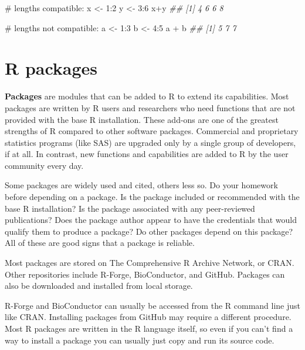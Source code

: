 \documentclass[
  13,
  letterpaper,
]{report}
\newenvironment{Shaded}{\begin{snugshade}}{\end{snugshade}}
\newcommand{\CommentTok}[1]{\textcolor[rgb]{0.37,0.37,0.37}{#1}}
\newcommand{\DecValTok}[1]{\textcolor[rgb]{0.68,0.00,0.00}{#1}}
\newcommand{\DocumentationTok}[1]{\textcolor[rgb]{0.37,0.37,0.37}{\textit{#1}}}
\newcommand{\NormalTok}[1]{\textcolor[rgb]{0.00,0.23,0.31}{#1}}
\newcommand{\OtherTok}[1]{\textcolor[rgb]{0.00,0.23,0.31}{#1}}
\newcommand{\SpecialCharTok}[1]{\textcolor[rgb]{0.37,0.37,0.37}{#1}}
\begin{document}
\begin{Shaded}
\begin{Highlighting}[]
\CommentTok{\# lengths compatible:}
\NormalTok{x }\OtherTok{\textless{}{-}} \DecValTok{1}\SpecialCharTok{:}\DecValTok{2}
\NormalTok{y }\OtherTok{\textless{}{-}} \DecValTok{3}\SpecialCharTok{:}\DecValTok{6}
\NormalTok{x}\SpecialCharTok{+}\NormalTok{y}
\DocumentationTok{\#\# [1] 4 6 6 8}

\CommentTok{\# lengths not compatible:}
\NormalTok{a }\OtherTok{\textless{}{-}} \DecValTok{1}\SpecialCharTok{:}\DecValTok{3}
\NormalTok{b }\OtherTok{\textless{}{-}} \DecValTok{4}\SpecialCharTok{:}\DecValTok{5}
\NormalTok{a }\SpecialCharTok{+}\NormalTok{ b}
\DocumentationTok{\#\# [1] 5 7 7}
\end{Highlighting}
\end{Shaded}

\section{R packages}\label{sec-02-pack}

\textbf{Packages} are modules that can be added to R to extend its
capabilities. Most packages are written by R users and researchers who
need functions that are not provided with the base R installation. These
add-ons are one of the greatest strengths of R compared to other
software packages. Commercial and proprietary statistics programs (like
SAS) are upgraded only by a single group of developers, if at all. In
contrast, new functions and capabilities are added to R by the user
community every day.

Some packages are widely used and cited, others less so. Do your
homework before depending on a package. Is the package included or
recommended with the base R installation? Is the package associated with
any peer-reviewed publications? Does the package author appear to have
the credentials that would qualify them to produce a package? Do other
packages depend on this package? All of these are good signs that a
package is reliable.

Most packages are stored on The Comprehensive R Archive Network, or
CRAN. Other repositories include R-Forge, BioConductor, and GitHub.
Packages can also be downloaded and installed from local storage.

R-Forge and BioConductor can usually be accessed from the R command line
just like CRAN. Installing packages from GitHub may require a different
procedure. Most R packages are written in the R language itself, so even
if you can't find a way to install a package you can usually just copy
and run its source code.
\end{document}
